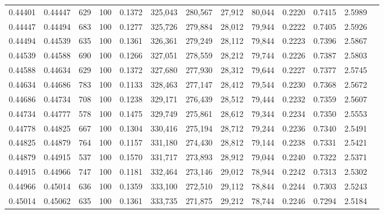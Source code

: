 \begin{tabular}{rrrrrrrrrrrrr}
0.44401 & 0.44447 &   629 & 100 &                                     0.1372 & 325,043 & 280,567 &  27,912 &  80,044 & 0.2220 & 0.7415 & 2.5989 \\
0.44447 & 0.44494 &   683 & 100 &                                     0.1277 & 325,726 & 279,884 &  28,012 &  79,944 & 0.2222 & 0.7405 & 2.5926 \\
0.44494 & 0.44539 &   635 & 100 &                                     0.1361 & 326,361 & 279,249 &  28,112 &  79,844 & 0.2223 & 0.7396 & 2.5867 \\
0.44539 & 0.44588 &   690 & 100 &                                     0.1266 & 327,051 & 278,559 &  28,212 &  79,744 & 0.2226 & 0.7387 & 2.5803 \\
0.44588 & 0.44634 &   629 & 100 &                                     0.1372 & 327,680 & 277,930 &  28,312 &  79,644 & 0.2227 & 0.7377 & 2.5745 \\
0.44634 & 0.44686 &   783 & 100 &                                     0.1133 & 328,463 & 277,147 &  28,412 &  79,544 & 0.2230 & 0.7368 & 2.5672 \\
0.44686 & 0.44734 &   708 & 100 &                                     0.1238 & 329,171 & 276,439 &  28,512 &  79,444 & 0.2232 & 0.7359 & 2.5607 \\
0.44734 & 0.44777 &   578 & 100 &                                     0.1475 & 329,749 & 275,861 &  28,612 &  79,344 & 0.2234 & 0.7350 & 2.5553 \\
0.44778 & 0.44825 &   667 & 100 &                                     0.1304 & 330,416 & 275,194 &  28,712 &  79,244 & 0.2236 & 0.7340 & 2.5491 \\
0.44825 & 0.44879 &   764 & 100 &                                     0.1157 & 331,180 & 274,430 &  28,812 &  79,144 & 0.2238 & 0.7331 & 2.5421 \\
0.44879 & 0.44915 &   537 & 100 &                                     0.1570 & 331,717 & 273,893 &  28,912 &  79,044 & 0.2240 & 0.7322 & 2.5371 \\
0.44915 & 0.44966 &   747 & 100 &                                     0.1181 & 332,464 & 273,146 &  29,012 &  78,944 & 0.2242 & 0.7313 & 2.5302 \\
0.44966 & 0.45014 &   636 & 100 &                                     0.1359 & 333,100 & 272,510 &  29,112 &  78,844 & 0.2244 & 0.7303 & 2.5243 \\
0.45014 & 0.45062 &   635 & 100 &                                     0.1361 & 333,735 & 271,875 &  29,212 &  78,744 & 0.2246 & 0.7294 & 2.5184 \\

\end{tabular}
